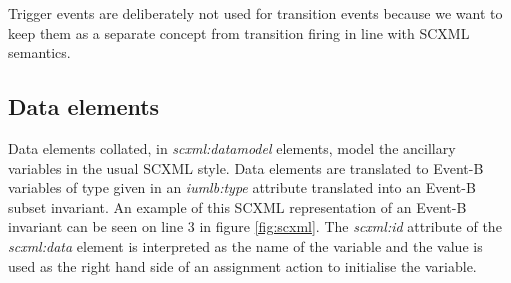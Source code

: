 Trigger events are deliberately not used for transition events because we 
want to keep them as a separate concept from transition firing in line 
with SCXML semantics.

\subsection{Data elements}
Data elements collated, in \emph{scxml:datamodel} elements, model the ancillary 
variables in the usual SCXML style. Data elements are translated to 
Event-B variables of type given in an \emph{iumlb:type} attribute translated 
into an Event-B subset invariant.  An example of this SCXML representation of an Event-B invariant can be seen on line 3 in figure \ref{fig:scxml}. The \emph{scxml:id} attribute of the 
\emph{scxml:data} element is interpreted as the name of the variable and 
the value is used as the right hand side of an assignment action to initialise 
the variable.  


